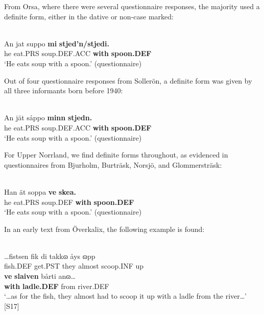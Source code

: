 \z

From Orsa, where there were several questionnaire responses, the majority used a definite form, either in the dative or non-case marked:


\ea \label{} 
\\
\gll An  jat  suppo  \textbf{mi} \textbf{  stjed’n/stjedi.}\\
he  eat.PRS  soup.DEF.ACC  \textbf{with} \textbf{spoon.DEF}\\
\glt ‘He eats soup with a spoon.’ (questionnaire)

\z

Out of four questionnaire responses from Sollerön, a definite form was given by all three informants born before 1940:


\ea \label{} 
\\
\gll An  jät  såppo  \textbf{minn} \textbf{  stjedn.} \\
he  eat.PRS  soup.DEF.ACC  \textbf{with} \textbf{spoon.DEF} \\
\glt ‘He eats soup with a spoon.’ (questionnaire)

\z

For Upper Norrland, we find definite forms throughout, as evidenced in questionnaires from Bjurholm, Burträsk, Norsjö, and Glommersträsk:

\ea \label{} 
\\
\gll Han  ät  soppa  \textbf{ve} \textbf{skea.} \\
he  eat.PRS  soup.DEF  \textbf{with} \textbf{spoon.DEF} \\
\glt ‘He eats soup with a spoon.’ (questionnaire)

\z

In an early text from Överkalix, the following example is found:

\ea \label{} 
\\
\gll …fistsen  fik  di  takkɷ  åys  ɷpp\\
fish.DEF  get.PST  they  almost  scoop.INF  up\\
\gll \textbf{ve} \textbf{slaiven} bårti  anɷ…\\
\textbf{with} \textbf{ladle.DEF} from  river.DEF\\
\glt ‘…as for the fish, they almost had to scoop it up with a ladle from the river…’ [S17]

